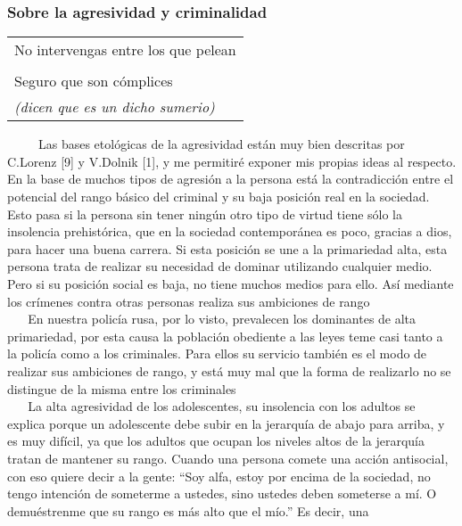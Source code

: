 \protect\hypertarget{M24}{}{}

\hypertarget{sobre-la-agresividad-y-criminalidad}{\subsubsection{Sobre
la agresividad y
criminalidad}\label{sobre-la-agresividad-y-criminalidad}}

\begin{longtable}[]{@{}l@{}}
\toprule
No intervengas entre los que pelean\tabularnewline
\tabularnewline
Seguro que son cómplices\tabularnewline
\emph{(dicen que es un dicho sumerio)}\tabularnewline
\bottomrule
\end{longtable}

~ ~ ~ Las bases etológicas de la agresividad están muy bien descritas
por C.Lorenz {[}9{]} y V.Dolnik {[}1{]}, y me permitiré exponer mis
propias ideas al respecto. En la base de muchos tipos de agresión a la
persona está la contradicción entre el potencial del rango básico del
criminal y su baja posición real en la sociedad. Esto pasa si la persona
sin tener ningún otro tipo de virtud tiene sólo la insolencia
prehistórica, que en la sociedad contemporánea es poco, gracias a dios,
para hacer una buena carrera. Si esta posición se une a la primariedad
alta, esta persona trata de realizar su necesidad de dominar utilizando
cualquier medio. Pero si su posición social es baja, no tiene muchos
medios para ello. Así mediante los crímenes contra otras personas
realiza sus ambiciones de rango\\
\hspace*{0.333em} ~ ~ En nuestra policía rusa, por lo visto, prevalecen
los dominantes de alta primariedad, por esta causa la población
obediente a las leyes teme casi tanto a la policía como a los
criminales. Para ellos su servicio también es el modo de realizar sus
ambiciones de rango, y está muy mal que la forma de realizarlo no se
distingue de la misma entre los criminales\\
\hspace*{0.333em} ~ ~ La alta agresividad de los adolescentes, su
insolencia con los adultos se explica porque un adolescente debe subir
en la jerarquía de abajo para arriba, y es muy difícil, ya que los
adultos que ocupan los niveles altos de la jerarquía tratan de mantener
su rango. Cuando una persona comete una acción antisocial, con eso
quiere decir a la gente: ``Soy alfa, estoy por encima de la sociedad, no
tengo intención de someterme a ustedes, sino ustedes deben someterse a
mí. O demuéstrenme que su rango es más alto que el mío.'' Es decir, una
